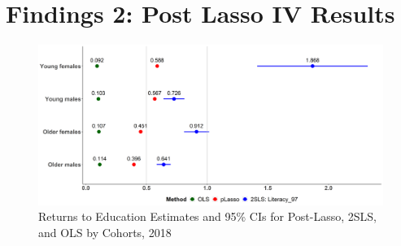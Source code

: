 \documentclass[alpha-refs]{wiley-article-04t}
\begin{document}
\section{Findings 2: Post Lasso IV Results}

\begin{figure}[h]
	\includegraphics[width=\textwidth]{iv_3_methods.png}
	\caption{Returns to Education Estimates and 95\% CIs for Post-Lasso, 2SLS, and OLS by Cohorts, 2018} \label{fig:5.3}
\end{figure}
\end{document}
